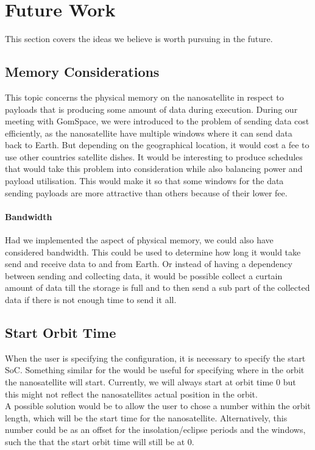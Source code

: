 \section{Future Work} \label{sec:future}
This section covers the ideas we believe is worth pursuing in the future.

\subsection{Memory Considerations}
This topic concerns the physical memory on the nanosatellite in respect to payloads that is producing some amount of data during execution. 
During our meeting with GomSpace, we were introduced to the problem of sending data cost efficiently, as the nanosatellite have multiple windows where it can send data back to Earth. 
But depending on the geographical location, it would cost a fee to use other countries satellite dishes.
It would be interesting to produce schedules that would take this problem into consideration while also balancing power and payload utilisation.
This would make it so that some windows for the data sending payloads are more attractive than others because of their lower fee.
\paragraph{Bandwidth}
Had we implemented the aspect of physical memory, we could also have considered bandwidth. This could be used to determine how long it would take send and receive data to and from Earth. Or instead of having a dependency between sending and collecting data, it would be possible collect a curtain amount of data till the storage is full and to then send a sub part of the collected data if there is not enough time to send it all.

\subsection{Start Orbit Time}
When the user is specifying the configuration, it is necessary to specify the start SoC. Something similar for the would be useful for specifying where in the orbit the nanosatellite will start. Currently, we will always start at orbit time 0 but this might not reflect the nanosatellites actual position in the orbit.\\
A possible solution would be to allow the user to chose a number within the orbit length, which will be the start time for the nanosatellite. Alternatively, this number could be as an offset for the insolation/eclipse periods and the windows, such the that the start orbit time will still be at 0.

